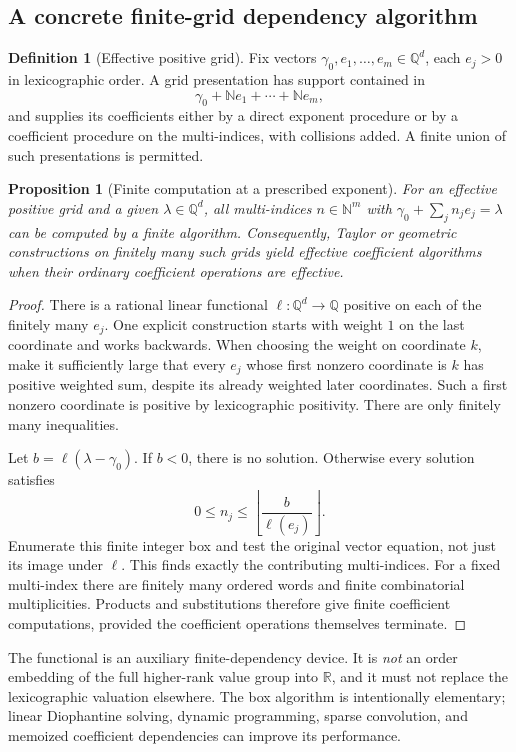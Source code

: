 \documentclass[11pt,letterpaper]{article}
\newtheorem{proposition}[theorem]{Proposition}
\theoremstyle{definition}\newtheorem{definition}[theorem]{Definition}
\theoremstyle{remark}\newtheorem{remark}[theorem]{Remark}
\newcommand{\R}{\mathbb R}\newcommand{\C}{\mathbb C}
\newcommand{\Q}{\mathbb Q}\newcommand{\N}{\mathbb N}\newcommand{\Z}{\mathbb Z}
\numberwithin{equation}{section}\setcounter{tocdepth}{2}
\begin{document}
\subsection{A concrete finite-grid dependency algorithm}
\begin{definition}[Effective positive grid]
Fix vectors $\gamma_0,e_1,\ldots,e_m\in\Q^d$, each $e_j>0$ in lexicographic order. A grid presentation has support contained in
\[
 \gamma_0+\N e_1+\cdots+\N e_m,
\]
and supplies its coefficients either by a direct exponent procedure or by a coefficient procedure on the multi-indices, with collisions added. A finite union of such presentations is permitted.
\end{definition}

\begin{proposition}[Finite computation at a prescribed exponent]\label{prop:grid}
For an effective positive grid and a given $\lambda\in\Q^d$, all multi-indices $n\in\N^m$ with $\gamma_0+\sum_j n_je_j=\lambda$ can be computed by a finite algorithm. Consequently, Taylor or geometric constructions on finitely many such grids yield effective coefficient algorithms when their ordinary coefficient operations are effective.
\end{proposition}
\begin{proof}
There is a rational linear functional $\ell:\Q^d\to\Q$ positive on each of the finitely many $e_j$. One explicit construction starts with weight $1$ on the last coordinate and works backwards. When choosing the weight on coordinate $k$, make it sufficiently large that every $e_j$ whose first nonzero coordinate is $k$ has positive weighted sum, despite its already weighted later coordinates. Such a first nonzero coordinate is positive by lexicographic positivity. There are only finitely many inequalities.

Let $b=\ell(\lambda-\gamma_0)$. If $b<0$, there is no solution. Otherwise every solution satisfies
\[
 0\le n_j\le \left\lfloor\frac{b}{\ell(e_j)}\right\rfloor.
\]
Enumerate this finite integer box and test the original vector equation, not just its image under $\ell$. This finds exactly the contributing multi-indices. For a fixed multi-index there are finitely many ordered words and finite combinatorial multiplicities. Products and substitutions therefore give finite coefficient computations, provided the coefficient operations themselves terminate.
\end{proof}
The functional is an auxiliary finite-dependency device. It is \emph{not} an order embedding of the full higher-rank value group into $\R$, and it must not replace the lexicographic valuation elsewhere. The box algorithm is intentionally elementary; linear Diophantine solving, dynamic programming, sparse convolution, and memoized coefficient dependencies can improve its performance.
\end{document}
